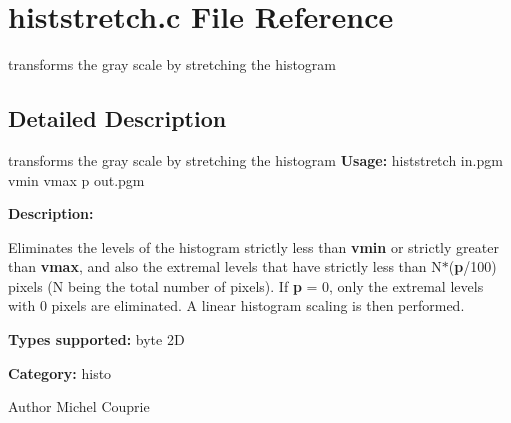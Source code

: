 \section{histstretch.c File Reference}
\label{histstretch_8c}


transforms the gray scale by stretching the histogram  




\subsection{Detailed Description}
transforms the gray scale by stretching the histogram {\bfseries Usage:} histstretch in.pgm vmin vmax p out.pgm

{\bfseries Description:}

Eliminates the levels of the histogram strictly less than {\bfseries vmin} or strictly greater than {\bfseries vmax}, and also the extremal levels that have strictly less than N$\ast$({\bfseries p}/100) pixels (N being the total number of pixels). If {\bfseries p} = 0, only the extremal levels with 0 pixels are eliminated. A linear histogram scaling is then performed.

{\bfseries Types supported:} byte 2D

{\bfseries Category:} histo

\begin{DoxyAuthor}{Author}
Michel Couprie 
\end{DoxyAuthor}
